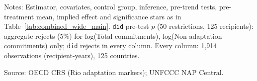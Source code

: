 \begin{table}[H]
\centering
\caption{Effect of NAP adoption on climate finance: simple ATT across outcomes (main specification excluding India (largest recipient))}
\label{tab:combined_wide_noindia}
\begingroup\small
{}
\endgroup
\par\vspace{4pt}
\begin{minipage}{\linewidth}\footnotesize
Notes: Estimator, covariates, control group, inference, pre-trend tests, pre-treatment mean, implied effect and significance stars as in Table~\ref{tab:combined_wide_main}. \texttt{did} pre-test $p$ (50 restrictions, 125 recipients): aggregate rejects (5\%) for log(Total commitments), log(Non-adaptation commitments) only; \texttt{did} rejects in every column. Every column: 1,914 observations (recipient-years), 125 countries.\par
Source: OECD CRS (Rio adaptation markers); UNFCCC NAP Central.
\end{minipage}
\end{table}
